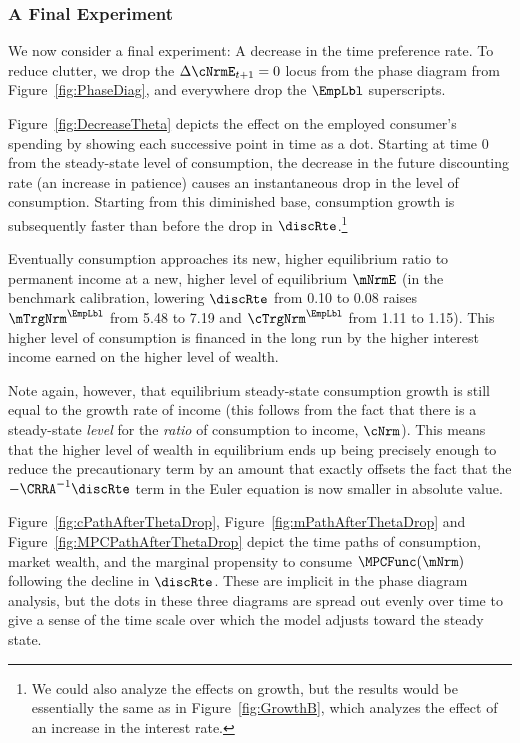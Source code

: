 \documentclass{econark}
\begin{document}
\subsubsection{A Final Experiment}\label{sec:FinalExperiment}
We now consider a final experiment: A decrease in the time preference
rate.  To reduce clutter, we drop the $\Delta \cNrmE_{t+1}=0$ locus from the 
phase diagram from Figure~\ref{fig:PhaseDiag}, and everywhere drop the $\EmpLbl$ superscripts.

Figure~\ref{fig:DecreaseTheta} depicts the effect on the 
employed consumer's spending by
showing each successive point in time as a dot.  
Starting at time 0 from the steady-state level of consumption, the
decrease in the future discounting rate (an increase in patience) causes
an instantaneous drop in the level of consumption.  Starting from this diminished 
base, consumption growth is subsequently faster than before the drop in $\discRte$.\footnote{We could also analyze the effects on growth, but the
  results would be essentially the same as in Figure~\ref{fig:GrowthB},
  which analyzes the effect of an increase in the interest rate.}

Eventually consumption approaches its new, higher equilibrium ratio
to permanent income at a new, higher level of equilibrium $\mNrmE$ (in the benchmark calibration, lowering $\discRte$ from 0.10 to 0.08 raises $\mTrgNrm^{\EmpLbl}$ from 5.48 to 7.19 and $\cTrgNrm^{\EmpLbl}$ from 1.11 to 1.15).  This
higher level of consumption is financed in the long run by the higher
interest income earned on the higher level of wealth.

Note again, however, that equilibrium steady-state 
consumption growth is still equal to the growth rate of income (this follows
from the fact that there is a steady-state {\it level} for the {\it
  ratio} of consumption to income, $\cNrm$).  This means that the higher
level of wealth in equilibrium ends up being precisely enough to
reduce the precautionary term by an amount that exactly offsets the
fact that the $-\CRRA^{-1}\discRte$ term in the Euler equation is now
smaller in absolute value.

Figure~\ref{fig:cPathAfterThetaDrop}, Figure~\ref{fig:mPathAfterThetaDrop} and Figure~\ref{fig:MPCPathAfterThetaDrop} depict the time paths of consumption, market wealth,
and the marginal propensity to consume $\MPCFunc(\mNrm)$ following the
decline in $\discRte$.  These are implicit in the phase diagram
analysis, but the dots in these three diagrams are spread out evenly
over time to give a sense of the time scale over which the model
adjusts toward the steady state.
\end{document}
